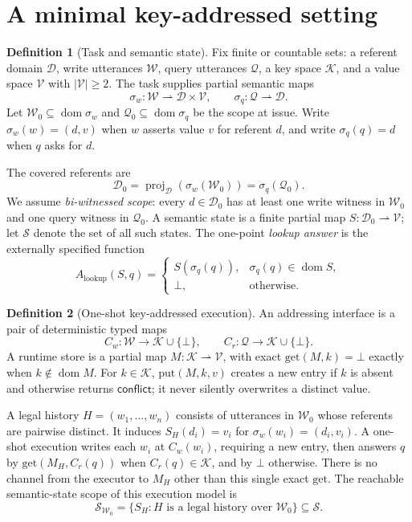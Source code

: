 \documentclass[11pt]{article}
\theoremstyle{definition}
\newtheorem{definition}{Definition}
\theoremstyle{plain}
\newcommand{\Dom}{\mathcal{D}}
\newcommand{\Wr}{\mathcal{W}}
\newcommand{\Qu}{\mathcal{Q}}
\newcommand{\Ky}{\mathcal{K}}
\newcommand{\Va}{\mathcal{V}}
\newcommand{\bt}{\bot}
\newcommand{\semw}{\sigma_w}
\newcommand{\semq}{\sigma_q}
\newcommand{\Alkup}{A_{\mathrm{lookup}}}
\begin{document}
\section{A minimal key-addressed setting}

\begin{definition}[Task and semantic state]\label{def:task}
Fix finite or countable sets: a referent domain \(\Dom\), write utterances
\(\Wr\), query utterances \(\Qu\), a key space \(\Ky\), and a value space
\(\Va\) with \(\lvert\Va\rvert\geq 2\).  The task supplies partial semantic
maps
\[
  \semw:\Wr\rightharpoonup\Dom\times\Va,
  \qquad
  \semq:\Qu\rightharpoonup\Dom .
\]
Let \(\Wr_0\subseteq\operatorname{dom}\semw\) and
\(\Qu_0\subseteq\operatorname{dom}\semq\) be the scope at issue.  Write
\(\semw(w)=(d,v)\) when \(w\) asserts value \(v\) for referent \(d\), and
write \(\semq(q)=d\) when \(q\) asks for \(d\).

The covered referents are
\[
  \Dom_0=\operatorname{proj}_{\Dom}(\semw(\Wr_0))=\semq(\Qu_0).
\]
We assume \emph{bi-witnessed scope}: every \(d\in\Dom_0\) has at least one
write witness in \(\Wr_0\) and one query witness in \(\Qu_0\).  A semantic
state is a finite partial map \(S:\Dom_0\rightharpoonup\Va\); let
\(\mathcal S\) denote the set of all such states.  The one-point
\emph{lookup answer} is the externally specified function
\[
 \Alkup(S,q)=
 \begin{cases}
   S(\semq(q)), & \semq(q)\in\operatorname{dom}S,\\
   \bt, & \text{otherwise.}
 \end{cases}
\]
\end{definition}

\begin{definition}[One-shot key-addressed execution]\label{def:execution}
An addressing interface is a pair of deterministic typed maps
\[
 C_w:\Wr\to\Ky\cup\{\bt\},\qquad
 C_r:\Qu\to\Ky\cup\{\bt\}.
\]
A runtime store is a partial map \(M:\Ky\rightharpoonup\Va\), with exact
\(\mathrm{get}(M,k)=\bt\) exactly when \(k\notin\operatorname{dom}M\).
For \(k\in\Ky\), \(\mathrm{put}(M,k,v)\) creates a new entry if \(k\) is
absent and otherwise returns \(\mathsf{conflict}\); it never silently
overwrites a distinct value.

A legal history \(H=(w_1,\ldots,w_n)\) consists of utterances in \(\Wr_0\)
whose referents are pairwise distinct.  It induces
\(S_H(d_i)=v_i\) for \(\semw(w_i)=(d_i,v_i)\).  A one-shot execution writes
each \(w_i\) at \(C_w(w_i)\), requiring a new entry, then answers \(q\) by
\(\mathrm{get}(M_H,C_r(q))\) when \(C_r(q)\in\Ky\), and by \(\bt\) otherwise.
There is no channel from the executor to \(M_H\) other than this single
exact \(\mathrm{get}\).  The reachable semantic-state scope of this execution
model is
\[
  \mathcal S_{\Wr_0}=\{S_H : H \text{ is a legal history over }\Wr_0\}
  \subseteq\mathcal S.
\]
\end{definition}
\end{document}
